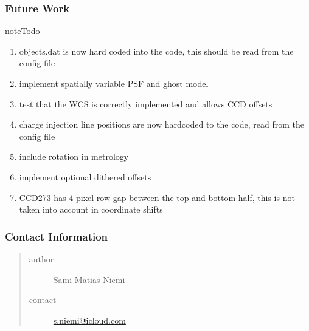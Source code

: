 \documentclass[a4paper,11pt,english]{sphinxmanual}
\begin{document}
\subsubsection{Future Work}
\label{simulator:future-work}
\begin{notice}{note}{Todo}
\begin{enumerate}
\item {} 
objects.dat is now hard coded into the code, this should be read from the config file

\item {} 
implement spatially variable PSF and ghost model

\item {} 
test that the WCS is correctly implemented and allows CCD offsets

\item {} 
charge injection line positions are now hardcoded to the code, read from the config file

\item {} 
include rotation in metrology

\item {} 
implement optional dithered offsets

\item {} 
CCD273 has 4 pixel row gap between the top and bottom half, this is not taken into account in coordinate shifts

\end{enumerate}
\end{notice}


\subsubsection{Contact Information}
\label{simulator:contact-information}\begin{quote}\begin{description}
\item[{author}] \leavevmode
Sami-Matias Niemi

\item[{contact}] \leavevmode
\href{mailto:s.niemi@icloud.com}{s.niemi@icloud.com}

\end{description}\end{quote}
\end{document}
